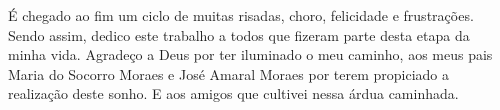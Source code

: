 
\begin{agradecimentos}[AGRADECIMENTOS]

É chegado ao fim um ciclo de muitas risadas, choro, felicidade e frustrações. Sendo assim, dedico este trabalho a todos que fizeram parte desta etapa da minha vida. Agradeço a Deus por ter iluminado o meu caminho, aos meus pais Maria do Socorro Moraes e José Amaral Moraes por terem propiciado a realização deste sonho. E aos amigos que cultivei nessa árdua caminhada.

\end{agradecimentos}
